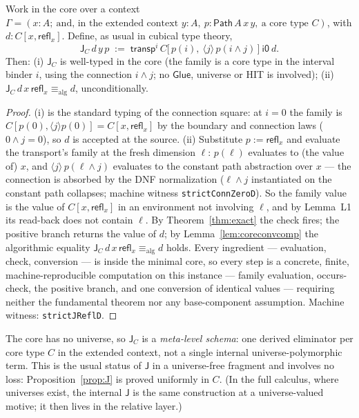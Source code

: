 \documentclass{lmcs}
\newcommand{\transp}{\mathsf{transp}}
\newcommand{\refl}{\mathsf{refl}}
\newcommand{\J}{\mathsf{J}}
\newcommand{\Glue}{\mathsf{Glue}}
\newcommand{\aconv}{\equiv_{\mathrm{alg}}}
\newcommand{\Path}{\mathsf{Path}}
\newcommand{\io}{\mathsf{i0}}
\begin{document}
\begin{prop}[Strict $\J$ in the minimal core; a schema]\label{prop:J}
  Work in the core over a context
  $\Gamma = (x : A;\ \text{and, in the extended context } y : A,\
  p : \Path\,A\,x\,y,\ \text{a core type } C)$, with
  $d : C[x, \refl_x]$.  Define, as usual in cubical type theory,
  \[
    \J_C\,d\,y\,p \;:=\;
    \transp^i\, C\bigl[\,p(i),\ \langle j \rangle\, p(i \wedge j)
    \,\bigr]\ \io\ d .
  \]
  Then: (i) $\J_C$ is well-typed in the core (the family is a core
  type in the interval binder $i$, using the connection
  $i \wedge j$; no $\Glue$, universe or HIT is involved);
  (ii) $\J_C\,d\,x\,\refl_x \aconv d$, unconditionally.
\end{prop}
\begin{proof}
  (i) is the standard typing of the connection square: at $i=0$
  the family is $C[p(0), \langle j \rangle p(0)] =
  C[x, \refl_x]$ by the boundary and connection laws ($0 \wedge j
  = 0$), so $d$ is accepted at the source.
  (ii) Substitute $p := \refl_x$ and evaluate the transport's
  family at the fresh dimension $\ell$:
  $p(\ell)$ evaluates to (the value of) $x$, and
  $\langle j \rangle\, p(\ell \wedge j)$ evaluates to the constant
  path abstraction over $x$ --- the connection is absorbed by the
  DNF normalization ($\ell \wedge j$ instantiated on the constant
  path collapses; machine witness \texttt{strictConnZeroD}).  So
  the family value is the value of $C[x, \refl_x]$ in an
  environment not involving $\ell$, and by Lemma~L1 its read-back
  does not contain $\ell$.  By Theorem~\ref{thm:exact} the check
  fires; the positive branch returns the value of $d$; by
  Lemma~\ref{lem:coreconvcomp} the algorithmic equality
  $\J_C\,d\,x\,\refl_x \aconv d$ holds.  Every ingredient ---
  evaluation, check, conversion --- is inside the minimal core, so
  every step is a concrete, finite, machine-reproducible
  computation on this instance --- family evaluation, occurs-check,
  the positive branch, and one conversion of identical values ---
  requiring neither the fundamental theorem nor any base-component
  assumption.
  Machine witness: \texttt{strictJReflD}.
\end{proof}

\begin{rem}
  The core has no universe, so $\J_C$ is a \emph{meta-level schema}:
  one derived eliminator per core type $C$ in the extended context,
  not a single internal universe-polymorphic term.  This is the
  usual status of $\J$ in a universe-free fragment and involves no
  loss: Proposition~\ref{prop:J} is proved uniformly in $C$.  (In
  the full calculus, where universes exist, the internal $\J$ is the
  same construction at a universe-valued motive; it then lives in
  the relative layer.)
\end{rem}
\end{document}

